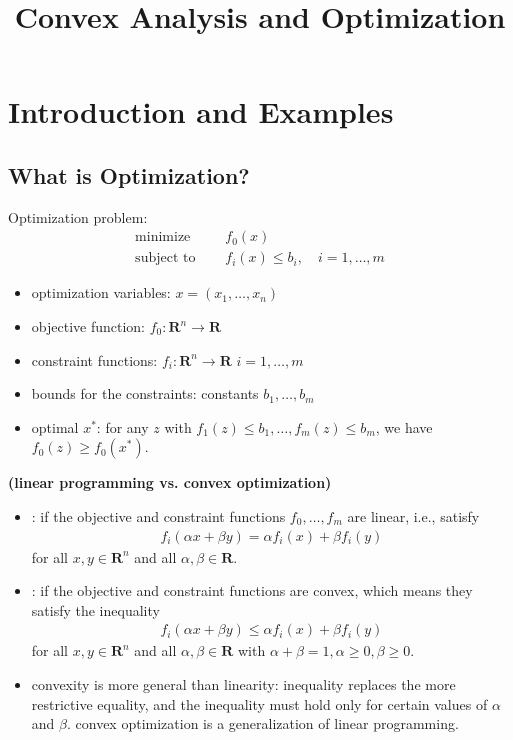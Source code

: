\documentclass{article}
\title{Convex Analysis and Optimization}
\newcommand{\bfs}[1]{\textbf{({#1}) }}
\begin{document}
\maketitle

\section{Introduction and Examples}
\subsection{What is Optimization?}
Optimization problem:
\begin{align}
\text{minimize} \quad &f_{0}(x) \label{eq:opt}\\
\text{subject to }\quad  &f_{i}(x) \leq b_{i}, \quad i=1, \ldots, m \nonumber 
\end{align}
\begin{itemize}
    \item optimization variables: $x=\left(x_{1}, \ldots, x_{n}\right)$
    \item objective function:  $f_{0}: \mathbf{R}^{n} \rightarrow \mathbf{R}$
    \item constraint functions: $f_{i}: \mathbf{R}^{n} \rightarrow \mathbf{R}$ $i=1, \ldots, m$
    \item bounds for the constraints:  constants $b_{1}, \ldots, b_{m}$ 
    \item optimal $x^* $:  for any $z$ with $f_{1}(z) \leq b_{1}, \ldots, f_{m}(z) \leq b_{m}$, we have $f_{0}(z) \geq f_{0}\left(x^* \right) .$
\end{itemize}
 \begin{rema}{\bfs{linear programming vs. convex optimization}}
 \begin{itemize}
     \item {} : if the objective and constraint functions $f_{0}, \ldots, f_{m}$ are linear, i.e., satisfy
\begin{align*}
f_{i}(\alpha x+\beta y)=\alpha f_{i}(x)+\beta f_{i}(y)
\end{align*}
for all $x, y \in \mathbf{R}^{n}$ and all $\alpha, \beta \in \mathbf{R}$. 
\item {}: if the objective and constraint functions are convex, which means they satisfy the inequality
\begin{align*}
f_{i}(\alpha x+\beta y) \leq \alpha f_{i}(x)+\beta f_{i}(y)
\end{align*}
for all $x, y \in \mathbf{R}^{n}$ and all $\alpha, \beta \in \mathbf{R}$ with $\alpha+\beta=1, \alpha \geq 0, \beta \geq 0$. \item {} convexity is more general than linearity: inequality replaces the more restrictive equality, and the inequality must hold only for certain values of $\alpha$ and $\beta$.  convex optimization is a generalization of linear programming.
 \end{itemize}
 \end{rema} 
 
\end{document}

